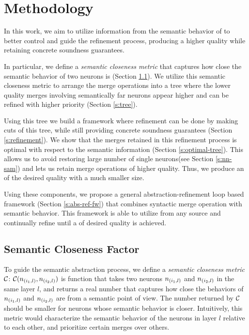 \section{Methodology}
\label{s:semantic-closeness}

In this work, we aim to utilize information from the semantic behavior of \cnc
to better control and guide the refinement process, producing a higher quality
\abs while retaining concrete soundness guarantees. 

In particular, we define a \textit{semantic
closeness metric} that captures how close the semantic behavior of two 
neurons is (Section \ref{s:semantic-closeness}). We utilize this semantic
closeness metric to arrange the merge
operations into a tree where the lower quality merges involving semantically far
neurons appear higher and can be refined with higher priority (Section
\ref{s:tree}). 

Using this tree we build a framework where refinement can
be done by making cuts of this tree, while still providing concrete soundness
guarantees (Section \ref{s:refinement}). We show that
the merges retained in this refinement process is optimal with respect to the
semantic information (Section \ref{s:optimal-tree}).
This allows us to avoid restoring large number of single neurons(see Section
\ref{s:nn-sam}) and lets us retain merge operations of higher quality. Thus, we
produce an \abs of the desired quality with a much smaller size. 

Using these components, we propose a general abstraction-refinement loop based
framework (Section \ref{s:abs-ref-fw}) that combines syntactic merge operation
with semantic behavior. This framework is able to utilize \gencex from any
source and continually refine until a \abs of desired quality is achieved.

\subsection{Semantic Closeness Factor}
\label{s:semantic-closeness}

To guide the semantic abstraction process, we define a \textit{semantic
closeness metric} $\mathcal{C}$: $\mathcal{C}(n_{(i_1,l)}, n_{(i_2,l)})$ is function that
takes two neurons $n_{(i_1,l)}$ and $n_{(i_2,l)}$ in
the same layer $l$, and returns a real number that
captures how close the behaviors of $n_{(i_1,l)}$ and $n_{(i_2,l)}$ are from a
semantic point of view. The number returned by $\mathcal{C}$ should be smaller for
neurons whose semantic behavior is closer. Intuitively, this metric would
characterize the semantic behavior of the
neurons in layer $l$ relative to each other, and prioritize certain merges over
others. 

